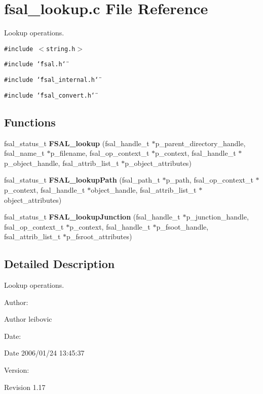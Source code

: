 \section{fsal\_\-lookup.c File Reference}
\label{fsal__lookup_8c}
Lookup operations. 

{\tt \#include $<$string.h$>$}\par
{\tt \#include \char`\"{}fsal.h\char`\"{}}\par
{\tt \#include \char`\"{}fsal\_\-internal.h\char`\"{}}\par
{\tt \#include \char`\"{}fsal\_\-convert.h\char`\"{}}\par
\subsection*{Functions}
\begin{CompactItemize}
\item 
fsal\_\-status\_\-t {\bf FSAL\_\-lookup} (fsal\_\-handle\_\-t $\ast$p\_\-parent\_\-directory\_\-handle, fsal\_\-name\_\-t $\ast$p\_\-filename, fsal\_\-op\_\-context\_\-t $\ast$p\_\-context, fsal\_\-handle\_\-t $\ast$p\_\-object\_\-handle, fsal\_\-attrib\_\-list\_\-t $\ast$p\_\-object\_\-attributes)
\item 
fsal\_\-status\_\-t {\bf FSAL\_\-lookup\-Path} (fsal\_\-path\_\-t $\ast$p\_\-path, fsal\_\-op\_\-context\_\-t $\ast$p\_\-context, fsal\_\-handle\_\-t $\ast$object\_\-handle, fsal\_\-attrib\_\-list\_\-t $\ast$object\_\-attributes)
\item 
fsal\_\-status\_\-t {\bf FSAL\_\-lookup\-Junction} (fsal\_\-handle\_\-t $\ast$p\_\-junction\_\-handle, fsal\_\-op\_\-context\_\-t $\ast$p\_\-context, fsal\_\-handle\_\-t $\ast$p\_\-fsoot\_\-handle, fsal\_\-attrib\_\-list\_\-t $\ast$p\_\-fsroot\_\-attributes)
\end{CompactItemize}


\subsection{Detailed Description}
Lookup operations. 

\begin{Desc}
\item[Author:]\begin{Desc}
\item[Author]leibovic \end{Desc}
\end{Desc}
\begin{Desc}
\item[Date:]\begin{Desc}
\item[Date]2006/01/24 13:45:37 \end{Desc}
\end{Desc}
\begin{Desc}
\item[Version:]\begin{Desc}
\item[Revision]1.17 \end{Desc}
\end{Desc}


